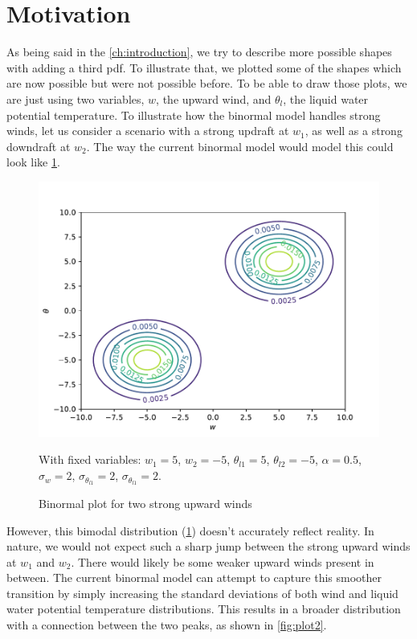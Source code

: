 \section{Motivation}\label{sec:motivation}

As being said in the \cref{ch:introduction},
we try to describe more possible shapes with adding a third \gls{pdf}.
To illustrate that, we plotted some of the shapes which are now possible but were not possible before.
To be able to draw those plots, we are just using two variables, $w$, the upward wind,
and $\theta_l$, the liquid water potential temperature.
To illustrate how the binormal model handles strong winds,
let us consider a scenario with a strong updraft at $w_1$, as well as a strong downdraft at $w_2$.
The way the current binormal model would model this could look like \cref{fig:plot1}.

\begin{figure}[!htb]
    \centering
    \includegraphics[width=.5\textwidth]{include/figures/plot1}
    \caption{Binormal plot for two strong upward winds}
    \label{fig:plot1}
    With fixed variables: $w_1 = 5$, $w_2 = -5$, $\theta_{l1} = 5$, $\theta_{l2} = -5$,
    $\alpha = 0.5$, $\sigma_w = 2$, $\sigma_{\theta_{l1}} = 2$, $\sigma_{\theta_{l1}} = 2$.
\end{figure}

However, this bimodal distribution (\cref{fig:plot1}) doesn't accurately reflect reality.
In nature, we would not expect such a sharp jump between the strong upward winds at $w_1$ and $w_2$.
There would likely be some weaker upward winds present in between.
The current binormal model can attempt to capture this smoother transition
by simply increasing the standard deviations of both wind
and liquid water potential temperature distributions.
This results in a broader distribution with a connection between the two peaks,
as shown in \cref{fig:plot2}.

